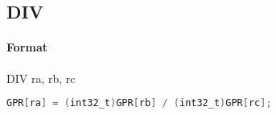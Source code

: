 \subsection{DIV}


\paragraph{Format} DIV ra, rb, rc

\begin{lstlisting}[language=C]
    GPR[ra] = (int32_t)GPR[rb] / (int32_t)GPR[rc];
\end{lstlisting}